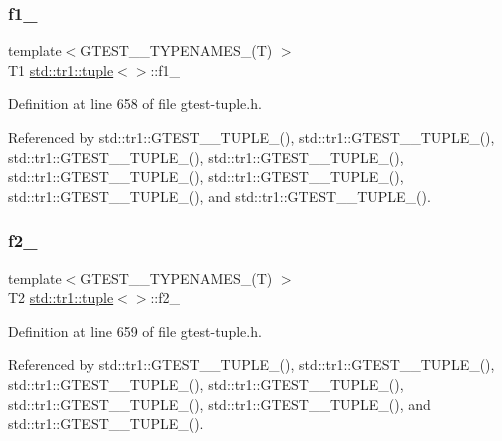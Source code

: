 \mbox{\label{classstd_1_1tr1_1_1tuple_a7cccf899dedc626c51fa4f6921d0ac52}} 
\subsubsection{\texorpdfstring{f1\+\_\+}{f1\_}}
{\footnotesize\ttfamily template$<$G\+T\+E\+S\+T\+\_\+\_\+\+T\+Y\+P\+E\+N\+A\+M\+E\+S\+\_\+(\+T) $>$ \\
T1 \hyperlink{classstd_1_1tr1_1_1tuple}{std\+::tr1\+::tuple}$<$$>$\+::f1\+\_\+}



Definition at line 658 of file gtest-\/tuple.\+h.



Referenced by std\+::tr1\+::\+G\+T\+E\+S\+T\+\_\+\_\+\+T\+U\+P\+L\+E\+\_\+(), std\+::tr1\+::\+G\+T\+E\+S\+T\+\_\+\_\+\+T\+U\+P\+L\+E\+\_\+(), std\+::tr1\+::\+G\+T\+E\+S\+T\+\_\+\_\+\+T\+U\+P\+L\+E\+\_\+(), std\+::tr1\+::\+G\+T\+E\+S\+T\+\_\+\_\+\+T\+U\+P\+L\+E\+\_\+(), std\+::tr1\+::\+G\+T\+E\+S\+T\+\_\+\_\+\+T\+U\+P\+L\+E\+\_\+(), std\+::tr1\+::\+G\+T\+E\+S\+T\+\_\+\_\+\+T\+U\+P\+L\+E\+\_\+(), std\+::tr1\+::\+G\+T\+E\+S\+T\+\_\+\_\+\+T\+U\+P\+L\+E\+\_\+(), and std\+::tr1\+::\+G\+T\+E\+S\+T\+\_\+\_\+\+T\+U\+P\+L\+E\+\_\+().

\mbox{\label{classstd_1_1tr1_1_1tuple_aaec06c27366502dc332ef96878628f84}} 
\subsubsection{\texorpdfstring{f2\+\_\+}{f2\_}}
{\footnotesize\ttfamily template$<$G\+T\+E\+S\+T\+\_\+\_\+\+T\+Y\+P\+E\+N\+A\+M\+E\+S\+\_\+(\+T) $>$ \\
T2 \hyperlink{classstd_1_1tr1_1_1tuple}{std\+::tr1\+::tuple}$<$$>$\+::f2\+\_\+}



Definition at line 659 of file gtest-\/tuple.\+h.



Referenced by std\+::tr1\+::\+G\+T\+E\+S\+T\+\_\+\_\+\+T\+U\+P\+L\+E\+\_\+(), std\+::tr1\+::\+G\+T\+E\+S\+T\+\_\+\_\+\+T\+U\+P\+L\+E\+\_\+(), std\+::tr1\+::\+G\+T\+E\+S\+T\+\_\+\_\+\+T\+U\+P\+L\+E\+\_\+(), std\+::tr1\+::\+G\+T\+E\+S\+T\+\_\+\_\+\+T\+U\+P\+L\+E\+\_\+(), std\+::tr1\+::\+G\+T\+E\+S\+T\+\_\+\_\+\+T\+U\+P\+L\+E\+\_\+(), std\+::tr1\+::\+G\+T\+E\+S\+T\+\_\+\_\+\+T\+U\+P\+L\+E\+\_\+(), and std\+::tr1\+::\+G\+T\+E\+S\+T\+\_\+\_\+\+T\+U\+P\+L\+E\+\_\+().

